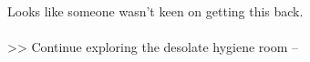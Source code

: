 Looks like someone wasn’t keen on getting this back.\\
\\

>> Continue exploring the desolate hygiene room -- 